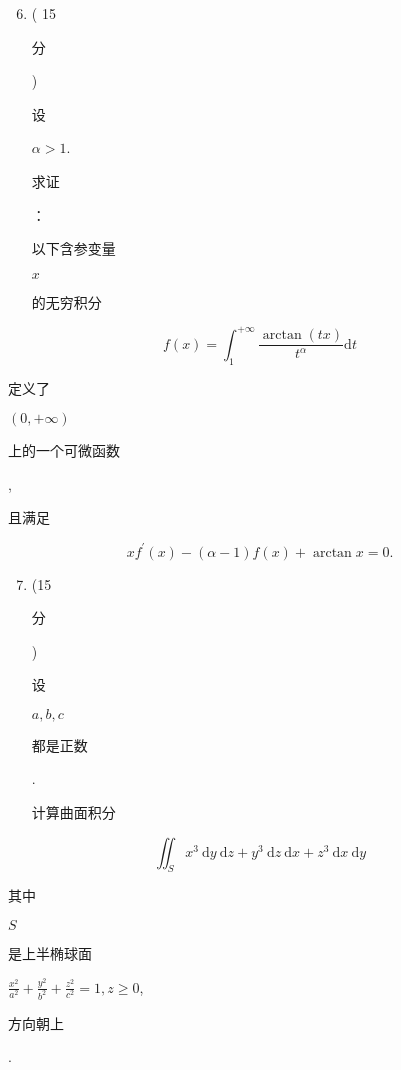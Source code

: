 \documentclass[10pt]{article}
\begin{document}
\begin{enumerate}
  \setcounter{enumi}{5}
  \item ( 15 \begin{CJK}{UTF8}{mj}分\end{CJK}) \begin{CJK}{UTF8}{mj}设\end{CJK} $\alpha>1$. \begin{CJK}{UTF8}{mj}求证\end{CJK}：\begin{CJK}{UTF8}{mj}以下含参变量\end{CJK} $x$ \begin{CJK}{UTF8}{mj}的无穷积分\end{CJK}
\end{enumerate}
$$
f(x)=\int_{1}^{+\infty} \frac{\arctan (t x)}{t^{\alpha}} \mathrm{d} t
$$
\begin{CJK}{UTF8}{mj}定义了\end{CJK} $(0,+\infty)$ \begin{CJK}{UTF8}{mj}上的一个可微函数\end{CJK}, \begin{CJK}{UTF8}{mj}且满足\end{CJK}
$$
x f^{\prime}(x)-(\alpha-1) f(x)+\arctan x=0 .
$$

\begin{enumerate}
  \setcounter{enumi}{6}
  \item (15 \begin{CJK}{UTF8}{mj}分\end{CJK}) \begin{CJK}{UTF8}{mj}设\end{CJK} $a, b, c$ \begin{CJK}{UTF8}{mj}都是正数\end{CJK}. \begin{CJK}{UTF8}{mj}计算曲面积分\end{CJK}
\end{enumerate}
$$
\iint_{S} x^{3} \mathrm{~d} y \mathrm{~d} z+y^{3} \mathrm{~d} z \mathrm{~d} x+z^{3} \mathrm{~d} x \mathrm{~d} y
$$
\begin{CJK}{UTF8}{mj}其中\end{CJK} $S$ \begin{CJK}{UTF8}{mj}是上半椭球面\end{CJK} $\frac{x^{2}}{a^{2}}+\frac{y^{2}}{b^{2}}+\frac{z^{2}}{c^{2}}=1, z \geqslant 0$, \begin{CJK}{UTF8}{mj}方向朝上\end{CJK}.
\end{document}

